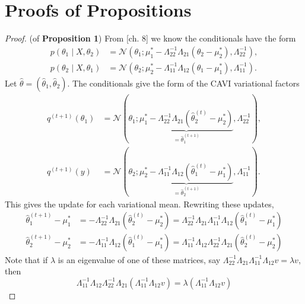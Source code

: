 \documentclass{article}
\begin{document}
\newpage

\appendix

\section{Proofs of Propositions}
\label{proofz}
\begin{proof} (of {\bf Proposition 1}) From \cite{Barber} [ch. 8] we know the conditionals have the form 
\begin{align}
p(\theta_1\mid X,\theta_2) 
&= \mathcal N(\theta_1; \mu_1^*-\Lambda_{22}^{-1}\Lambda_{21}(\theta_2-\mu_2^*),\Lambda_{22}^{-1}), \\
p(\theta_2\mid X,\theta_1) 
&= \mathcal N(\theta_2; \mu_2^*-\Lambda_{11}^{-1}\Lambda_{12}(\theta_1-\mu_1^*),\Lambda_{11}^{-1}).
\end{align}
Let $\widehat\theta = (\widehat\theta_1,\widehat\theta_2)$. The conditionals give the form of the CAVI variational factors \cite{Blei}
\begin{align}
q^{(t+1)}(\theta_1) &= 
\mathcal N(\theta_1; \underbrace{\mu_1^*-\Lambda_{22}^{-1}\Lambda_{21}(\widehat\theta_2^{(t)}-\mu_2^*)}_{=\widehat\theta_1^{(t+1)}},\Lambda_{22}^{-1}), \\
q^{(t+1)}(y) 
&= \mathcal N(\theta_2; \underbrace{\mu_2^*-\Lambda_{11}^{-1}\Lambda_{12}(\widehat\theta_1^{(t)}-\mu_1^*)}_{=\widehat\theta_2^{(t+1)}},\Lambda_{11}^{-1}).
\end{align}
This gives the update for each variational mean. Rewriting these updates,
\begin{align}
\widehat\theta_1^{(t+1)} - \mu_1^*  
&= -\Lambda_{22}^{-1}\Lambda_{21}(\widehat\theta_2^{(t)}-\mu_2^*)
=\Lambda_{22}^{-1}\Lambda_{21}\Lambda_{11}^{-1}\Lambda_{12}(\widehat\theta_1^{(t)}-\mu_1^*) \\
\widehat\theta_2^{(t+1)} - \mu_2^*  
&= -\Lambda_{11}^{-1}\Lambda_{12}(\widehat\theta_1^{(t)}-\mu_1^*)
=\Lambda_{11}^{-1}\Lambda_{12}\Lambda_{22}^{-1}\Lambda_{21}(\widehat\theta_2^{(t)}-\mu_2^*)
\end{align}
Note that if $\lambda$ is an eigenvalue of one of these matrices, say $\Lambda_{22}^{-1}\Lambda_{21}\Lambda_{11}^{-1}\Lambda_{12} v = \lambda v$, then 
$$
\Lambda_{11}^{-1}\Lambda_{12}\Lambda_{22}^{-1}\Lambda_{21}(\Lambda_{11}^{-1}\Lambda_{12} v) = \lambda (\Lambda_{11}^{-1}\Lambda_{12}v)
$$
\end{proof}
\end{document}
